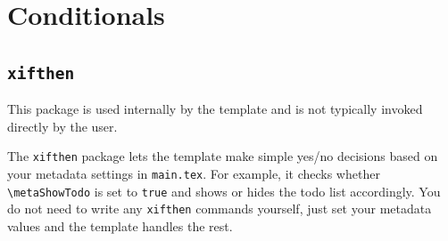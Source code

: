
\begin{abstract} %
This document is a beginner-friendly guide to this template. Each section introduces one or more packages included in the template, explains what it does in plain terms, and shows a simple working example. To get the most out of this file, open the compiled PDF and the source \texttt{example.tex} file side by side. Reading the code while looking at the result it produces is the fastest way to understand how each feature works.
\end{abstract}
\newpage

\tableofcontents
\newpage

\listoftodos %

\listoffigures

\listoftables
\newpage

\section{Conditionals}

\subsection{\texttt{xifthen}}
\noindent\colorbox{themecolour!15}{\parbox{\linewidth}{\small This package is used internally by the template and is not typically invoked directly by the user.}}\vspace{0.5\baselineskip}

The \texttt{xifthen} package lets the template make simple yes/no decisions based on your metadata settings in \texttt{main.tex}. For example, it checks whether \texttt{\textbackslash metaShowTodo} is set to \texttt{true} and shows or hides the todo list accordingly. You do not need to write any \texttt{xifthen} commands yourself, just set your metadata values and the template handles the rest.

